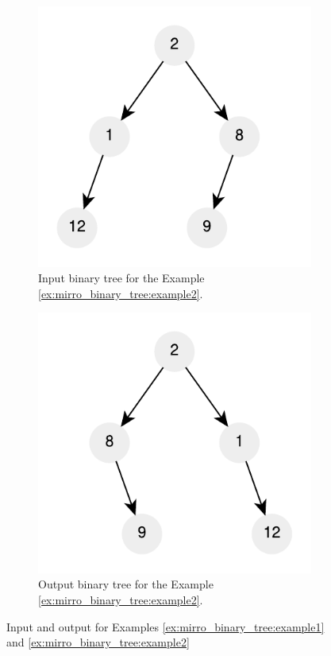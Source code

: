 \begin{figure}
\begin{subfigure}[b]{0.4\textwidth}
	   \label{fig:mirro_binary_tree:example1_1}
	\end{subfigure}
	\centering
	\begin{subfigure}[b]{0.4\textwidth}
	   \includegraphics[]{sources/mirror_binary_tree/images/example2}
	   \caption{Input binary tree for the Example \ref{ex:mirro_binary_tree:example2}.}
	   \label{fig:mirro_binary_tree:example2}
	\end{subfigure}
	\hfill
	\begin{subfigure}[b]{0.4\textwidth}
	   \includegraphics[]{sources/mirror_binary_tree/images/example2_1}
	   \caption{Output binary tree for the Example \ref{ex:mirro_binary_tree:example2}.}
	   \label{fig:mirro_binary_tree:example2_1}
	\end{subfigure}
	\centering

	 \caption[]{Input and output for Examples \ref{ex:mirro_binary_tree:example1} and
	 \ref{ex:mirro_binary_tree:example2}}
\end{figure}


